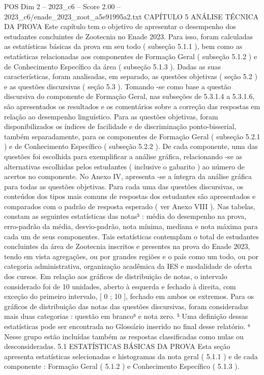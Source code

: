 \begin{textsample}{POS Dim 2 – 2023\_c6 – Score 2.00 – 2023\_c6/enade\_2023\_zoot\_a5e91995a2.txt}  \label{ex:f2_pos_167}
CAPÍTULO 5 ANÁLISE TÉCNICA DA PROVA Este capítulo tem o objetivo de apresentar o desempenho dos estudantes concluintes de Zootecnia no Enade 2023.
Para isso, foram calculadas as estatísticas básicas da prova em seu todo ( subseção 5.1.1 ), bem como as estatísticas relacionadas aos componentes de Formação Geral ( subseção 5.1.2 ) e de Conhecimento Específico da área ( subseção 5.1.3 ).
Dadas as suas características, foram analisadas, em separado, as questões objetivas ( seção 5.2 ) e as questões discursivas ( seção 5.3 ).
Tomando -se como base a questão discursiva do componente de Formação Geral, nas subseções de 5.3.1.4 a 5.3.1.6, são apresentados os resultados e os comentários sobre a correção das respostas em relação ao desempenho linguístico.
Para as questões objetivas, foram disponibilizados os índices de facilidade e de discriminação ponto-bisserial, também separadamente, para os componentes de Formação Geral ( subseção 5.2.1 ) e de Conhecimento Específico ( subseção 5.2.2 ).
De cada componente, uma das questões foi escolhida para exemplificar a análise gráfica, relacionando -se as alternativas escolhidas pelos estudantes ( inclusive o gabarito ) ao número de acertos no componente.
No Anexo IV, apresenta -se a íntegra da análise gráfica para todas as questões objetivas.
Para cada uma das questões discursivas, os conteúdos dos tipos mais comuns de respostas dos estudantes são apresentados e comparados com o padrão de resposta esperado ( ver Anexo VIII ).
Nas tabelas, constam as seguintes estatísticas das notas⁵ : média do desempenho na prova, erro-padrão da média, desvio-padrão, nota mínima, mediana e nota máxima para cada um de seus componentes.
Tais estatísticas contemplam o total de estudantes concluintes da área de Zootecnia inscritos e presentes na prova do Enade 2023, tendo em vista agregações, ou por grandes regiões e o país como um todo, ou por categoria administrativa, organização acadêmica da IES e modalidade de oferta dos cursos.
Em relação aos gráficos de distribuição de notas, o intervalo considerado foi de 10 unidades, aberto à esquerda e fechado à direita, com exceção do primeiro intervalo, [ 0 ; 10 ], fechado em ambos os extremos.
Para os gráficos de distribuição das notas das questões discursivas, foram consideradas mais duas categorias : questão em branco⁶ e nota zero. ⁵ Uma definição dessas estatísticas pode ser encontrada no Glossário inserido no final desse relatório. ⁶ Nesse grupo estão incluídas também as respostas classificadas como nulas ou desconsideradas. 5.1 ESTATÍSTICAS BÁSICAS DA PROVA Esta seção apresenta estatísticas selecionadas e histogramas da nota geral ( 5.1.1 ) e de cada componente : Formação Geral ( 5.1.2 ) e Conhecimento Específico ( 5.1.3 ).

\end{textsample}
